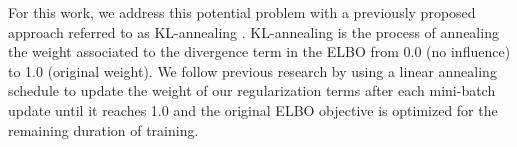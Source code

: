 
For this work, we address this potential problem with a previously proposed approach referred to as KL-annealing \cite{bowman2015GeneratingSent,sonderby2016LadderVAE}. KL-annealing is the process of annealing the weight associated to the divergence term in the ELBO from 0.0 (no influence) to 1.0 (original weight). We follow previous research by using a linear annealing schedule to update the weight of our regularization terms after each mini-batch update until it reaches 1.0 and the original ELBO objective is optimized for the remaining duration of training. 



